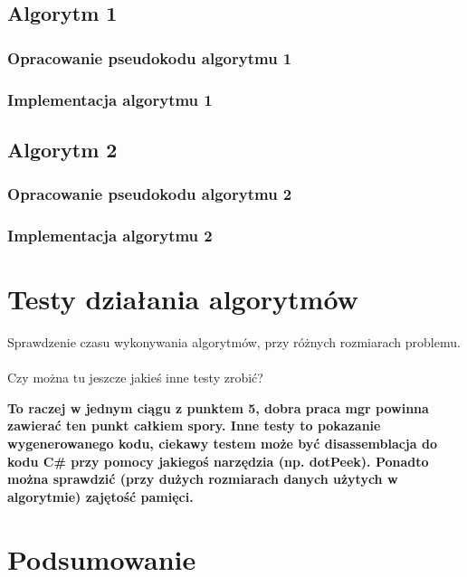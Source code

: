 \documentclass[a4paper]{article}
\begin{document}
\subsection{Algorytm 1}
\subsubsection{Opracowanie pseudokodu algorytmu 1}
\subsubsection{Implementacja algorytmu 1}
\subsection{Algorytm 2}
\subsubsection{Opracowanie pseudokodu algorytmu 2}
\subsubsection{Implementacja algorytmu 2}

\section{Testy działania algorytmów}
Sprawdzenie czasu wykonywania algorytmów, przy różnych rozmiarach problemu.
\\\\
Czy można tu jeszcze jakieś inne testy zrobić?

\textbf{ To raczej w jednym ciągu z punktem 5, dobra praca mgr powinna zawierać ten punkt całkiem spory.
Inne testy to pokazanie wygenerowanego kodu, ciekawy testem może być disassemblacja do kodu C\# przy pomocy jakiegoś narzędzia (np. dotPeek). Ponadto można sprawdzić (przy dużych rozmiarach danych użytych w algorytmie) zajętość pamięci.}

\section{Podsumowanie}
\end{document}
